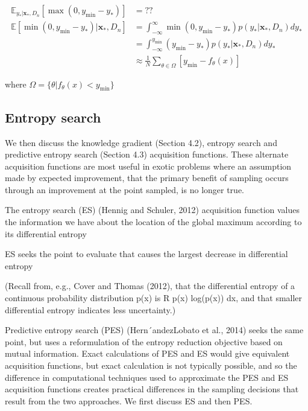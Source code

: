 \begin{align*}
    \mathbb{E}_{y_*|\textbf{x}_*,D_n}[\max(0,y_{\min}-y_*)] &= ??\\
    \mathbb{E}[\min(0,y_{\min}-y_*)|\textbf{x}_*,D_n] &= \int_{-\infty}^\infty \min(0,y_{\min}-y_*) p(y_*|\textbf{x}_*,D_n) dy_*\\
    &= \int_{-\infty}^{y_{\min}} (y_{\min}-y_*) p(y_*|\textbf{x}_*,D_n) dy_*\\
    &\approx \frac{1}{N} \sum_{\theta \in \Omega } [y_{\min}-f_\theta(x)]
\end{align*}

where $\Omega = \{\theta|f_{\theta}(x)< y_{\min}\}$


\subsection{Entropy search}
We then discuss the knowledge
gradient (Section 4.2), entropy search and predictive entropy search (Section 4.3) acquisition functions.
These alternate acquisition functions are most useful in exotic problems where an assumption made by
expected improvement, that the primary benefit of sampling occurs through an improvement at the point
sampled, is no longer true.


The entropy search (ES) (Hennig and Schuler, 2012) acquisition function values the information we have
about the location of the global maximum according to its differential entropy

ES seeks the point to evaluate that causes the largest decrease in differential entropy

(Recall from, e.g., Cover and Thomas (2012),
that the differential entropy of a continuous probability distribution p(x) is R
p(x) log(p(x)) dx, and that
smaller differential entropy indicates less uncertainty.)

Predictive entropy search (PES) (Hern´andezLobato et al., 2014) seeks the same point, but uses a reformulation of the entropy reduction objective
based on mutual information. Exact calculations of PES and ES would give equivalent acquisition functions, but exact calculation is not typically possible, and so the difference in computational techniques
used to approximate the PES and ES acquisition functions creates practical differences in the sampling
decisions that result from the two approaches. We first discuss ES and then PES.

